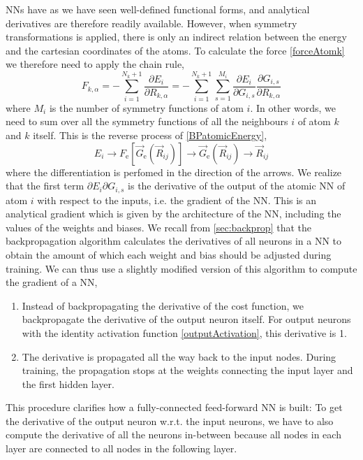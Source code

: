 \documentclass[twoside,english]{uiofysmaster}
\begin{document}
NNs have as we have seen well-defined functional forms, and analytical derivatives are therefore readily available.
However, when symmetry transformations is applied, there is only an indirect relation between the energy and the cartesian coordinates
of the atoms. To calculate the force \eqref{forceAtomk} we therefore need to apply the chain rule,
\begin{equation}
 F_{k,\alpha} = -\sum_{i=1}^{N_k+1}\frac{\partial E_i}{\partial R_{k,\alpha}} = 
 -\sum_{i=1}^{N_k+1}\sum_{s=1}^{M_i}\frac{\partial E_i}{\partial G_{i,s}}\frac{\partial G_{i,s}}{\partial R_{k,\alpha}}
 \label{forceAtomkChainRule}
\end{equation}
where $M_i$ is the number of symmetry functions of atom $i$. In other words, we need to sum over all the symmetry functions
of all the neighbours $i$ of atom $k$ and $k$ itself. This is the reverse process of \eqref{BPatomicEnergy},
\begin{equation}
 E_i \rightarrow F_\mathrm{e}[\vec{G}_\mathrm{e}(\vec{R}_{ij})] \rightarrow
 \vec{G}_\mathrm{e}(\vec{R}_{ij}) \rightarrow  \vec{R}_{ij}   
 \label{BPatomicForce}
\end{equation}
where the differentiation is perfomed in the direction of the arrows. 
We realize that the first term
$\partial E_i\partial G_{i,s}$ is the derivative of the output of the atomic NN of atom $i$ with respect to the inputs,
i.e. the gradient of the NN. This is an analytical gradient
which is given by the architecture of the NN, including the values of the weights and biases.
We recall from \ref{sec:backprop} that the backpropagation algorithm calculates the derivatives of all neurons in a NN to obtain
the amount of which each weight and bias should be adjusted during training. We can thus use a slightly modified version
of this algorithm to compute the gradient of a NN,
\begin{enumerate}
 \item Instead of backpropagating the derivative of the cost function, 
 we backpropagate the derivative of the output neuron itself.
 For output neurons with the identity activation function \eqref{outputActivation}, 
 this derivative is 1. 
 \item The derivative is propagated all the way back to the input nodes. During training, the propagation
 stops at the weights connecting the input layer and the first hidden layer. 
\end{enumerate}
This procedure clarifies how a fully-connected feed-forward NN is built: To get the derivative of the output neuron
w.r.t. the input neurons, we have to also compute the derivative of all the neurons in-between because
all nodes in each layer are connected to all nodes in the following layer. 
\end{document}
